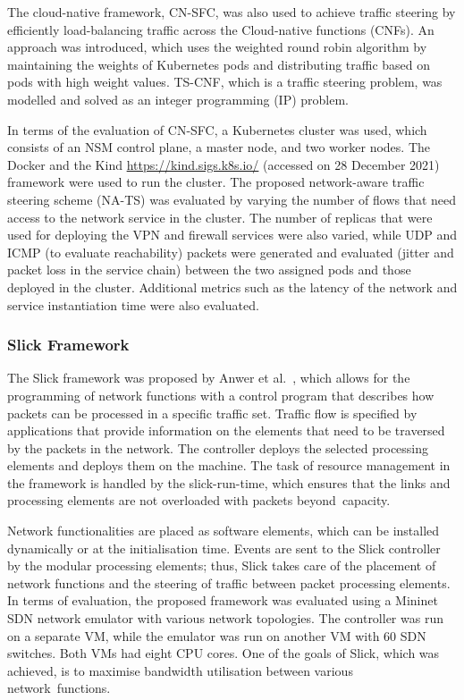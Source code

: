 \documentclass[futureinternet,review,accept,pdftex,moreauthors]{Definitions/mdpi}
\begin{document}
The cloud-native framework, CN-SFC, was also used to achieve traffic steering by efficiently load-balancing traffic across the Cloud-native functions (CNFs). An approach was introduced, which uses the weighted round robin algorithm by maintaining the weights of Kubernetes pods and distributing traffic based on pods with high weight values. TS-CNF, which is a traffic steering problem, was modelled and solved as an integer programming (IP) problem.

In terms of the evaluation of CN-SFC, a Kubernetes cluster was used, which consists of an NSM control plane, a master node, and two worker nodes. The Docker and the Kind {\url{https://kind.sigs.k8s.io/}}  ({accessed} %
on 28 December 2021) framework were used to run the cluster. The proposed network-aware traffic steering scheme (NA-TS) was evaluated by varying the number of flows that need access to the network service in the cluster. The number of replicas that were used for deploying the VPN and firewall services were also varied, while UDP and ICMP (to evaluate reachability) packets were generated and evaluated (jitter and packet loss in the service chain) between the two assigned pods and those deployed in the cluster. Additional metrics such as the latency of the network and service instantiation time were also evaluated. 


\subsubsection{Slick Framework}
\label{Slick}
The Slick framework was proposed by Anwer {et al.}~\cite{anwer2015programming}, which allows for the programming of network functions with a control program that describes how packets can be processed in a specific traffic set. Traffic flow is specified by applications that provide information on the elements that need to be traversed by the packets in the network. The controller deploys the selected processing elements and deploys them on the machine. The task of resource management in the framework is handled by the slick-run-time, which ensures that the links and processing elements are not overloaded with packets beyond~capacity. 

Network functionalities are placed as software elements, which can be installed dynamically or at the initialisation time. Events are sent to the Slick controller by the modular processing elements; thus, Slick takes care of the placement of network functions and the steering of traffic between packet processing elements. In terms of evaluation, the proposed framework was evaluated using a Mininet SDN network emulator with various network topologies. The controller was run on a separate VM, while the emulator was run on another VM with 60 SDN switches. Both VMs had  eight CPU cores. One of the goals of Slick, which was achieved, is to maximise bandwidth utilisation between various network~functions.
\end{document}

